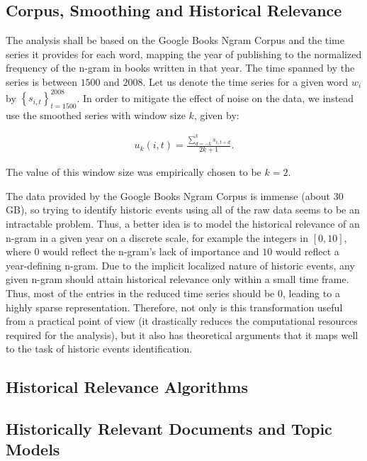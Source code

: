 
\subsection{Corpus, Smoothing and Historical Relevance}

The analysis shall be based on the Google Books Ngram Corpus and the time series it provides for each word, mapping the year of publishing to the normalized frequency of the n-gram in books written in that year. The time spanned by the series is between $1500$ and $2008$. Let us denote the time series for a given word $w_i$ by $\left\{ s_{i, t} \right\}_{t = 1500}^{2008}$. In order to mitigate the effect of noise on the data, we instead use the smoothed series with window size $k$, given by:

\begin{align}
\label{eq:smooth-series}
u_{k} \left( i, t \right) = \frac{\sum_{d = -k}^{k} s_{i, t + d}}{2k + 1}.
\end{align}

The value of this window size was empirically chosen to be $k = 2$.

The data provided by the Google Books Ngram Corpus is immense (about 30 GB), so trying to identify historic events using all of the raw data seems to be an intractable problem. Thus, a better idea is to model the historical relevance of an n-gram in a given year on a discrete scale, for example the integers in $\left[ 0, 10 \right]$, where $0$ would reflect the n-gram's lack of importance and $10$ would reflect a year-defining n-gram. Due to the implicit localized nature of historic events, any given n-gram should attain historical relevance only within a small time frame. Thus, most of the entries in the reduced time series should be $0$, leading to a highly sparse representation. Therefore, not only is this transformation useful from a practical point of view (it drastically reduces the computational resources required for the analysis), but it also has theoretical arguments that it maps well to the task of historic events identification.

\subsection{Historical Relevance Algorithms}
\label{sec:historical-relevance-algorithms}


\subsection{Historically Relevant Documents and Topic Models}

